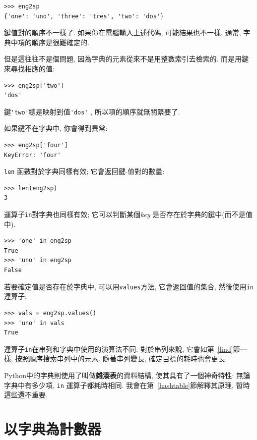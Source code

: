 \documentclass[10pt]{book}
\begin{document}
\begin{verbatim}
>>> eng2sp
{'one': 'uno', 'three': 'tres', 'two': 'dos'}
\end{verbatim}
%
鍵值對的順序不一樣了. 
如果你在電腦輸入上述代碼, 可能結果也不一樣. 
通常, 字典中項的順序是很難確定的. 

但是這往往不是個問題, 因為字典的元素從來不是用整數索引去檢索的. 
而是用鍵來尋找相應的值:

\begin{verbatim}
>>> eng2sp['two']
'dos'
\end{verbatim}
%
鍵\verb"'two'"總是映射到值\verb"'dos'" , 所以項的順序就無關緊要了. 

如果鍵不在字典中, 你會得到異常:

\begin{verbatim}
>>> eng2sp['four']
KeyError: 'four'
\end{verbatim}
%
 {\tt len} 函數對於字典同樣有效; 它會返回鍵-值對的數量:

\begin{verbatim}
>>> len(eng2sp)
3
\end{verbatim}
%
運算子{\tt in}對字典也同樣有效;
它可以判斷某個{\em key} 是否存在於字典的鍵中(而不是值中). 

\begin{verbatim}
>>> 'one' in eng2sp
True
>>> 'uno' in eng2sp
False
\end{verbatim}
%
若要確定值是否存在於字典中, 可以用{\tt values}方法, 它會返回值的集合,  
然後使用{\tt in}運算子:

\begin{verbatim}
>>> vals = eng2sp.values()
>>> 'uno' in vals
True
\end{verbatim}
%
運算子{\tt in}在串列和字典中使用的演算法不同. 
對於串列來說, 它會如第~\ref{find}節一樣, 按照順序搜索串列中的元素. 
隨著串列變長, 確定目標的耗時也會更長. 

Python中的字典則使用了叫做{\bf 雜湊表}的資料結構, 使其具有了一個神奇特性: 
無論字典中有多少項, {\tt in} 運算子都耗時相同. 
我會在第~\ref{hashtable}節解釋其原理, 暫時這些還不重要. 

\section{以字典為計數器}
\label{histogram}
\end{document}
